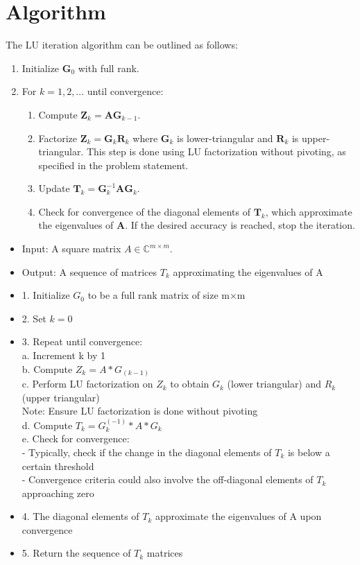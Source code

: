 \documentclass{article}
\begin{document}
\section*{Algorithm}
The LU iteration algorithm can be outlined as follows:

\begin{enumerate}
    \item Initialize $\boldsymbol{G}_0$ with full rank.
    \item For $k = 1, 2, \dots$ until convergence:
    \begin{enumerate}
        \item Compute $\boldsymbol{Z}_k = \boldsymbol{A} \boldsymbol{G}_{k-1}$.
        \item Factorize $\boldsymbol{Z}_k = \boldsymbol{G}_k \boldsymbol{R}_k$ where $\boldsymbol{G}_k$ is lower-triangular and $\boldsymbol{R}_k$ is upper-triangular. This step is done using LU factorization without pivoting, as specified in the problem statement.
        \item Update $\boldsymbol{T}_k = \boldsymbol{G}_k^{-1} \boldsymbol{A} \boldsymbol{G}_k$.
        \item Check for convergence of the diagonal elements of $\boldsymbol{T}_k$, which approximate the eigenvalues of $\boldsymbol{A}$. If the desired accuracy is reached, stop the iteration.
    \end{enumerate}
\end{enumerate}
\begin{itemize}
\item Input: A square matrix $A \in \mathbb{C}^{m \times m}$.
\item Output: A sequence of matrices $T_k$ approximating the eigenvalues of A
\item 1. Initialize $G_0$ to be a full rank matrix of size m×m
\item 2. Set $k = 0$

\item 3. Repeat until convergence:\\
    a. Increment k by 1\\
    b. Compute $Z_k = A * G_(k-1)$\\
    c. Perform LU factorization on $Z_k$ to obtain $G_k$ (lower triangular) and $R_k$ (upper triangular)\\
       Note: Ensure LU factorization is done without pivoting\\
    d. Compute $T_k = G_k^(-1) * A * G_k$\\
    e. Check for convergence:\\
       - Typically, check if the change in the diagonal elements of $T_k$ is below a certain threshold\\
       - Convergence criteria could also involve the off-diagonal elements of $T_k$ approaching zero\\

\item 4. The diagonal elements of $T_k$ approximate the eigenvalues of A upon convergence

\item 5. Return the sequence of $T_k$ matrices
\end{itemize}
\end{document}
